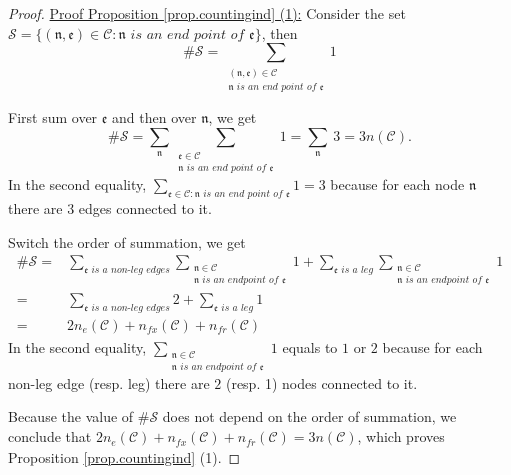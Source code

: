 \begin{proof}
\underline{Proof Proposition \ref{prop.countingind} (1):} Consider the set $\mathcal{S}=\{(\mathfrak{n}, \mathfrak{e})\in \mathcal{C}: \mathfrak{n} \textit{ is an end point of }\mathfrak{e}\}$, then 
\begin{equation}
\#\mathcal{S}=\sum_{\substack{(\mathfrak{n}, \mathfrak{e})\in \mathcal{C}\\ \mathfrak{n} \textit{ is an end point of }\mathfrak{e}}} 1
\end{equation}

First sum over $\mathfrak{e}$ and then over $\mathfrak{n}$, we get 
\begin{equation}
\#\mathcal{S}=\sum_{\mathfrak{n}}\sum_{\substack{\mathfrak{e}\in \mathcal{C}\\ \mathfrak{n} \textit{ is an end point of }\mathfrak{e}}} 1=\sum_{\mathfrak{n}}\ 3=3n(\mathcal{C}).
\end{equation}
In the second equality, $\sum_{\mathfrak{e}\in \mathcal{C}: \mathfrak{n} \textit{ is an end point of }\mathfrak{e}} 1 =3$ because for each node $\mathfrak{n}$ there are $3$ edges connected to it.

Switch the order of summation, we get 
\begin{equation}
\begin{split}
\#\mathcal{S}=&\sum_{\mathfrak{e} \textit{ is a non-leg edges}}\sum_{\substack{\mathfrak{n}\in \mathcal{C}\\ \mathfrak{n} \textit{ is an endpoint of }\mathfrak{e}}} 1+\sum_{\mathfrak{e} \textit{ is a leg}}\sum_{\substack{\mathfrak{n}\in \mathcal{C}\\ \mathfrak{n} \textit{ is an endpoint of }\mathfrak{e}}} 1
\\
=&\sum_{\mathfrak{e} \textit{ is a non-leg edges}} 2+\sum_{\mathfrak{e} \textit{ is a leg}} 1
\\
=& 2n_e(\mathcal{C})+n_{fx}(\mathcal{C})+n_{\textit{fr}}(\mathcal{C})
\end{split}
\end{equation}
In the second equality, $\sum_{\substack{\mathfrak{n}\in \mathcal{C}\\ \mathfrak{n} \textit{ is an endpoint of }\mathfrak{e}}} 1$ equals to $1$ or $2$ because for each non-leg edge (resp. leg) there are $2$ (resp. 1) nodes connected to it.

Because the value of $\#\mathcal{S}$ does not depend on the order of summation, we conclude that $2n_e(\mathcal{C})+n_{fx}(\mathcal{C})+n_{\textit{fr}}(\mathcal{C})=3n(\mathcal{C})$, which proves Proposition \ref{prop.countingind} (1).



\end{proof}
